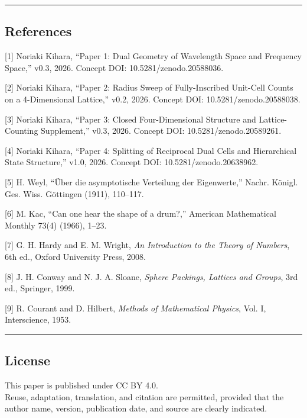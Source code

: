 \documentclass[
]{article}
\begin{document}
\begin{center}\rule{0.5\linewidth}{0.5pt}\end{center}

\subsection{References}\label{references}

{[}1{]} Noriaki Kihara, ``Paper 1: Dual Geometry of Wavelength Space and
Frequency Space,'' v0.3, 2026. Concept DOI: 10.5281/zenodo.20588036.

{[}2{]} Noriaki Kihara, ``Paper 2: Radius Sweep of Fully-Inscribed
Unit-Cell Counts on a 4-Dimensional Lattice,'' v0.2, 2026. Concept DOI:
10.5281/zenodo.20588038.

{[}3{]} Noriaki Kihara, ``Paper 3: Closed Four-Dimensional Structure and
Lattice-Counting Supplement,'' v0.3, 2026. Concept DOI:
10.5281/zenodo.20589261.

{[}4{]} Noriaki Kihara, ``Paper 4: Splitting of Reciprocal Dual Cells
and Hierarchical State Structure,'' v1.0, 2026. Concept DOI:
10.5281/zenodo.20638962.

{[}5{]} H. Weyl, ``Über die asymptotische Verteilung der Eigenwerte,''
Nachr. Königl. Ges. Wiss. Göttingen (1911), 110--117.

{[}6{]} M. Kac, ``Can one hear the shape of a drum?,'' American
Mathematical Monthly 73(4) (1966), 1--23.

{[}7{]} G. H. Hardy and E. M. Wright, \emph{An Introduction to the
Theory of Numbers}, 6th ed., Oxford University Press, 2008.

{[}8{]} J. H. Conway and N. J. A. Sloane, \emph{Sphere Packings,
Lattices and Groups}, 3rd ed., Springer, 1999.

{[}9{]} R. Courant and D. Hilbert, \emph{Methods of Mathematical
Physics}, Vol. I, Interscience, 1953.

\begin{center}\rule{0.5\linewidth}{0.5pt}\end{center}

\subsection{License}\label{license}

This paper is published under CC BY 4.0.\\
Reuse, adaptation, translation, and citation are permitted, provided
that the author name, version, publication date, and source are clearly
indicated.
\end{document}
